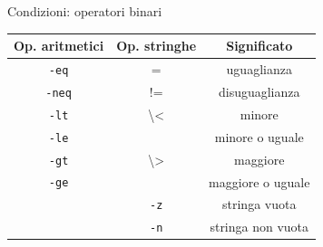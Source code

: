 \documentclass{beamer}
\begin{document}
    \begin{frame}{Condizioni: operatori binari}
        \begin{center}
            \begin{tabular}{ |c|c|c| } 
                \hline
                \textbf{Op. aritmetici} & \textbf{Op. stringhe} & \textbf{Significato} \\
                \hline
                \texttt{-eq} & = & uguaglianza \\
                \hline
                \texttt{-neq} & != & disuguaglianza \\
                \hline
                \texttt{-lt} & \textbackslash< & minore \\
                \hline
                \texttt{-le} & & minore o uguale \\
                \hline
                \texttt{-gt} & \textbackslash> & maggiore \\
                \hline
                \texttt{-ge} & & maggiore o uguale \\
                \hline
                & \texttt{-z} & stringa vuota \\
                \hline
                & \texttt{-n} & stringa non vuota \\
                \hline
            \end{tabular}
        \end{center}
    \end{frame}
\end{document}
